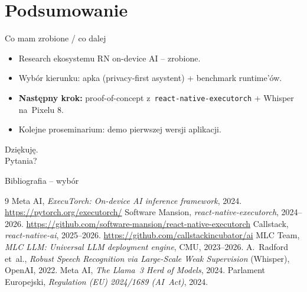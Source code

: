\documentclass[aspectratio=169,11pt]{beamer}
\begin{document}
\section{Podsumowanie}

\begin{frame}{Co mam zrobione / co dalej}
  \begin{itemize}
    \item[\textbullet] Research ekosystemu RN on-device AI -- \alert{zrobione}.
    \item[\textbullet] Wybór kierunku: apka (privacy-first asystent) + benchmark runtime'ów.
    \item[$\to$] \textbf{Następny krok:} proof-of-concept z~\texttt{react-native-executorch} + Whisper na~Pixelu 8.
    \item[$\to$] Kolejne proseminarium: demo pierwszej wersji aplikacji.
  \end{itemize}
\end{frame}

\begin{frame}[standout]
  Dziękuję.\\[0.5em]
  \large Pytania?
\end{frame}

\appendix

\begin{frame}[allowframebreaks]{Bibliografia -- wybór}
  \footnotesize
  \begin{thebibliography}{9}
      Meta AI, \emph{ExecuTorch: On-device AI inference framework}, 2024.
      \url{https://pytorch.org/executorch/}
      Software Mansion, \emph{react-native-executorch}, 2024--2026.
      \url{https://github.com/software-mansion/react-native-executorch}
      Callstack, \emph{react-native-ai}, 2025--2026.
      \url{https://github.com/callstackincubator/ai}
      MLC Team, \emph{MLC LLM: Universal LLM deployment engine}, CMU, 2023--2026.
      A.~Radford et~al., \emph{Robust Speech Recognition via Large-Scale Weak Supervision} (Whisper), OpenAI, 2022.
      Meta AI, \emph{The Llama~3 Herd of Models}, 2024.
      Parlament Europejski, \emph{Regulation (EU) 2024/1689 (AI~Act)}, 2024.
  \end{thebibliography}
\end{frame}
\end{document}
